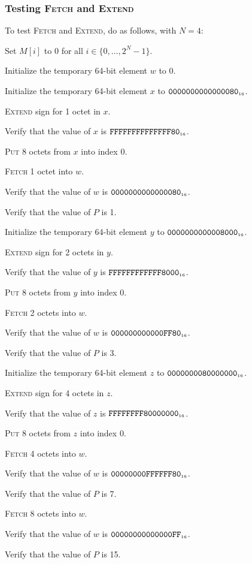 \documentclass[a4paper,12pt]{article}
\newcommand{\num}[1]{\texttt{#1}}
\newcommand{\hex}[1]{\num{#1}_{\textup{\tiny 16}}}
\newcommand{\PC}{P}
\newcommand{\range}[2]{\{#1,\ldots,#2\}}
\newcommand{\proc}[1]{\textsc{#1}}
\begin{document}
\subsubsection{Testing \proc{Fetch} and \proc{Extend}}

To test \proc{Fetch} and \proc{Extend}, do as follows, with $N=4$:
\begin{stepnumbers}
\item Set $M[i]$ to 0 for all $i \in \range{0}{2^N-1}$.
\item Initialize the temporary 64-bit element $w$ to 0.
\item Initialize the temporary 64-bit element $x$ to $\hex{0000000000000080}$.
\item \proc{Extend} sign for 1 octet in $x$.
\item Verify that the value of $x$ is $\hex{FFFFFFFFFFFFFF80}$.
\item \proc{Put} 8 octets from $x$ into index 0.
\item \proc{Fetch} 1 octet into $w$.
\item Verify that the value of $w$ is $\hex{0000000000000080}$.
\item Verify that the value of $\PC$ is 1.
\item Initialize the temporary 64-bit element $y$ to $\hex{0000000000008000}$.
\item \proc{Extend} sign for 2 octets in $y$.
\item Verify that the value of $y$ is $\hex{FFFFFFFFFFFF8000}$.
\item \proc{Put} 8 octets from $y$ into index 0.
\item \proc{Fetch} 2 octets into $w$.
\item Verify that the value of $w$ is $\hex{000000000000FF80}$.
\item Verify that the value of $\PC$ is 3.
\item Initialize the temporary 64-bit element $z$ to $\hex{0000000080000000}$.
\item \proc{Extend} sign for 4 octets in $z$.
\item Verify that the value of $z$ is $\hex{FFFFFFFF80000000}$.
\item \proc{Put} 8 octets from $z$ into index 0.
\item \proc{Fetch} 4 octets into $w$.
\item Verify that the value of $w$ is $\hex{00000000FFFFFF80}$.
\item Verify that the value of $\PC$ is 7.
\item \proc{Fetch} 8 octets into $w$.
\item Verify that the value of $w$ is $\hex{00000000000000FF}$.
\item Verify that the value of $\PC$ is 15.
\end{stepnumbers}
\end{document}
